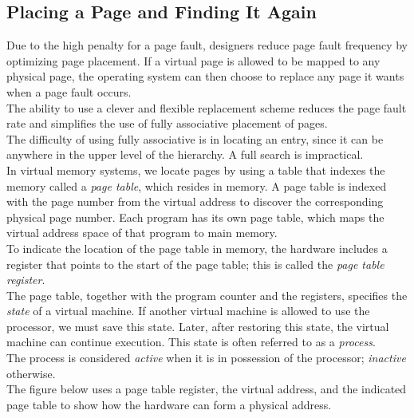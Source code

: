 \documentclass[12pt]{article}
\theoremstyle{definition}
\begin{document}
  \subsection{Placing a Page and Finding It Again}
  Due to the high penalty for a page fault, designers reduce page fault frequency by optimizing page placement.
  If a virtual page is allowed to be mapped to any physical page, the operating system can then choose to replace any page it wants when a page fault occurs. \\
  The ability to use a clever and flexible replacement scheme reduces the page fault rate and simplifies the use of fully associative placement of pages. \\

  The difficulty of using fully associative is in locating an entry, since it can be anywhere in the upper level of the hierarchy.
  A full search is impractical. \\
  In virtual memory systems, we locate pages by using a table that indexes the memory called a \emph{page table}, which resides in memory.
  A page table is indexed with the page number from the virtual address to discover the corresponding physical page number.
  Each program has its own page table, which maps the virtual address space of that program to main memory. \\
  To indicate the location of the page table in memory, the hardware includes a register that points to the start of the page table;
  this is called the \emph{page table register}. \\

  The page table, together with the program counter and the registers, specifies the \emph{state} of a virtual machine.
  If another virtual machine is allowed to use the processor, we must save this state.
  Later, after restoring this state, the virtual machine can continue execution.
  This state is often referred to as a \emph{process}. \\
  The process is considered \emph{active} when it is in possession of the processor;
  \emph{inactive} otherwise. \\

  The figure below uses a page table register, the virtual address, and the indicated page table to show how the hardware can form a physical address.
\end{document}
